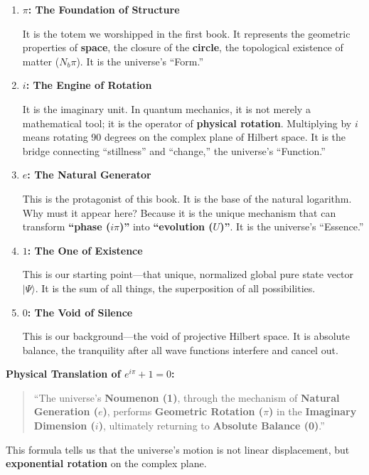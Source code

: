 \begin{enumerate}
\item \textbf{$\pi$: The Foundation of Structure}

    It is the totem we worshipped in the first book. It represents the geometric properties of \textbf{space}, the closure of the \textbf{circle}, the topological existence of matter ($N_b\pi$). It is the universe's ``Form.''

\item \textbf{$i$: The Engine of Rotation}

    It is the imaginary unit. In quantum mechanics, it is not merely a mathematical tool; it is the operator of \textbf{physical rotation}. Multiplying by $i$ means rotating 90 degrees on the complex plane of Hilbert space. It is the bridge connecting ``stillness'' and ``change,'' the universe's ``Function.''

\item \textbf{$e$: The Natural Generator}

    This is the protagonist of this book. It is the base of the natural logarithm. Why must it appear here? Because it is the unique mechanism that can transform \textbf{``phase ($i\pi$)''} into \textbf{``evolution ($U$)''}. It is the universe's ``Essence.''

\item \textbf{$1$: The One of Existence}

    This is our starting point---that unique, normalized global pure state vector $|\Psi\rangle$. It is the sum of all things, the superposition of all possibilities.

\item \textbf{$0$: The Void of Silence}

    This is our background---the void of projective Hilbert space. It is absolute balance, the tranquility after all wave functions interfere and cancel out.
\end{enumerate}

\textbf{Physical Translation of $e^{i\pi} + 1 = 0$:}

\begin{quote}
``The universe's \textbf{Noumenon (1)}, through the mechanism of \textbf{Natural Generation ($e$)}, performs \textbf{Geometric Rotation ($\pi$)} in the \textbf{Imaginary Dimension ($i$)}, ultimately returning to \textbf{Absolute Balance (0)}.''
\end{quote}

This formula tells us that the universe's motion is not linear displacement, but \textbf{exponential rotation} on the complex plane.

